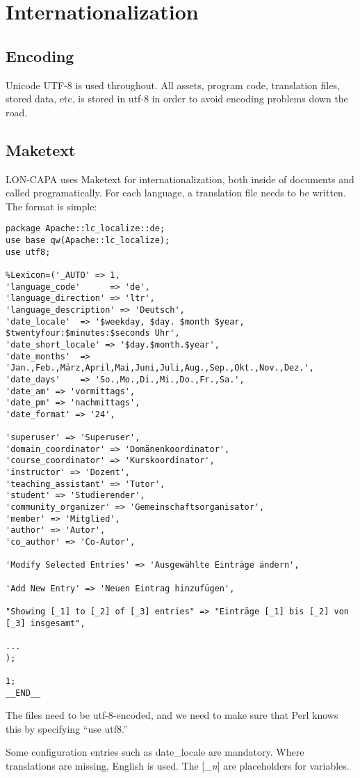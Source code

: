 \chapter{Internationalization}
\section{Encoding}
Unicode UTF-8 is used throughout. All assets, program code, translation files, stored data, etc, is stored in utf-8 in order to avoid encoding problems down the road.
\section{Maketext}
LON-CAPA uses Maketext for internationalization, both inside of documents and called programatically. For each language, a translation file needs to be written. The format is simple:
\begin{verbatim}
package Apache::lc_localize::de;
use base qw(Apache::lc_localize);
use utf8;

%Lexicon=('_AUTO' => 1,
'language_code'      => 'de',
'language_direction' => 'ltr',
'language_description' => 'Deutsch',
'date_locale'  => '$weekday, $day. $month $year, $twentyfour:$minutes:$seconds Uhr',
'date_short_locale' => '$day.$month.$year',
'date_months'  => 'Jan.,Feb.,März,April,Mai,Juni,Juli,Aug.,Sep.,Okt.,Nov.,Dez.',
'date_days'    => 'So.,Mo.,Di.,Mi.,Do.,Fr.,Sa.',
'date_am' => 'vormittags',
'date_pm' => 'nachmittags',
'date_format' => '24',

'superuser' => 'Superuser',
'domain_coordinator' => 'Domänenkoordinator',
'course_coordinator' => 'Kurskoordinator',
'instructor' => 'Dozent',
'teaching_assistant' => 'Tutor',
'student' => 'Studierender',
'community_organizer' => 'Gemeinschaftsorganisator',
'member' => 'Mitglied',
'author' => 'Autor',
'co_author' => 'Co-Autor',

'Modify Selected Entries' => 'Ausgewählte Einträge ändern',

'Add New Entry' => 'Neuen Eintrag hinzufügen',

"Showing [_1] to [_2] of [_3] entries" => "Einträge [_1] bis [_2] von [_3] insgesamt",

...
);

1;
__END__
\end{verbatim}
The files need to be utf-8-encoded, and we need to make sure that Perl knows this by specifying ``use utf8.''

Some configuration entries such as date\_locale are mandatory. Where translations are missing, English is used. The [\_{\it n}] are placeholders for variables.

